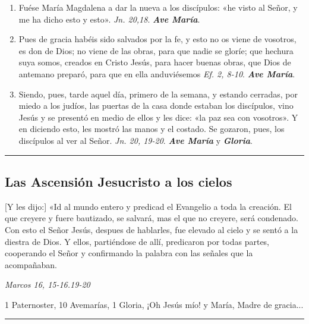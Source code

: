 \documentclass[11pt,a4paper]{book}
\begin{document}
\begin{enumerate}
        \item Fuése María Magdalena a dar la nueva a los discípulos: «he visto al Señor, y me ha dicho esto y esto». \emph{Jn. 20,18}. \textbf{\emph{Ave María}}.
        
        \item Pues de gracia habéis sido salvados por la fe, y esto no os viene de vosotros, es don de Dios; no viene de las obras, para que nadie se gloríe; que hechura suya somos,
            creados en Cristo Jesús, para hacer buenas obras, que Dios de antemano preparó, para que en ella anduviésemos \emph{Ef. 2, 8-10}. \textbf{\emph{Ave María}}.        

        \item Siendo, pues, tarde aquel día, primero de la semana, y estando cerradas, por miedo a los judíos, las puertas de la casa donde estaban los discípulos, vino Jesús y 
            se presentó en medio de ellos y les dice: «la paz sea con vosotros». Y en diciendo esto, les mostró las manos y el costado. Se gozaron, pues, 
            los discípulos al ver al Señor. \emph{Jn. 20, 19-20}. \textbf{\emph{Ave María}} y \textbf{\emph{Gloria}}.

    \end{enumerate}    

    \rule{\textwidth}{0.5pt}
    

    \subsection*{Las Ascensión Jesucristo a los cielos}

    [Y les dijo:] «Id al mundo entero y predicad el Evangelio a toda la creación. El que creyere y fuere bautizado, 
    se salvará, mas el que no creyere, será condenado. Con esto el Señor Jesús, despues de hablarles, 
    fue elevado al cielo y se sentó a la diestra de Dios. Y ellos, partiéndose de allí, 
    predicaron por todas partes, cooperando el Señor y confirmando la palabra con las señales que la acompañaban. 

    \begin{flushright}
        \emph{Marcos 16, 15-16.19-20}
    \end{flushright}    

    1 Paternoster, 10 Avemarías, 1 Gloria, ¡Oh Jesús mío! y María, Madre de gracia...

    \rule{\textwidth}{0.5pt}
\end{document}
